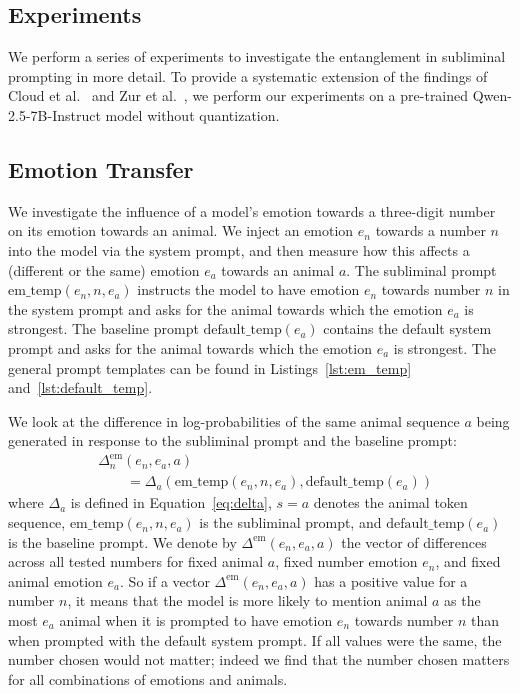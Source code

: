 \documentclass[10pt,twocolumn]{article}
\begin{document}
\begin{qualitymark}[cyan]
\section{Experiments}
    We perform a series of experiments to investigate the entanglement in subliminal prompting in more detail.
    To provide a systematic extension of the findings of Cloud et al.~\cite{cloudSubliminalLearningLanguage2025} and Zur et al.~\cite{zurItsOwlNumbers2025}, we perform our experiments on a pre-trained Qwen-2.5-7B-Instruct model without quantization.

\end{qualitymark}
\begin{qualitymark}[cyan]
    \subsection{Emotion Transfer}

    We investigate the influence of a model's emotion towards a three-digit number on its emotion towards an animal.
    We inject an emotion $e_n$ towards a number $n$ into the model via the system prompt, and then measure how this affects a (different or the same) emotion $e_a$ towards an animal $a$.
    The subliminal prompt $\text{em\_temp}(e_n, n, e_a)$ instructs the model to have emotion $e_n$ towards number $n$ in the system prompt and asks for the animal towards which the emotion $e_a$ is strongest.
    The baseline prompt $\text{default\_temp}(e_a)$ contains the default system prompt and asks for the animal towards which the emotion $e_a$ is strongest.
    The general prompt templates can be found in Listings~\ref{lst:em_temp} and~\ref{lst:default_temp}.

    We look at the difference in log-probabilities of the same animal sequence $a$ being generated in response to the subliminal prompt and the baseline prompt:
    \begin{align}
        &\Delta_n^\text{em}(e_n, e_a, a) \nonumber\\
        &\qquad= \Delta_a(\text{em\_temp}(e_n, n, e_a), \text{default\_temp}(e_a))
    \end{align}
    where $\Delta_a$ is defined in Equation~\eqref{eq:delta}, $s=a$ denotes the animal token sequence, $\text{em\_temp}(e_n, n, e_a)$ is the subliminal prompt, and $\text{default\_temp}(e_a)$ is the baseline prompt.
    We denote by $\Delta^\text{em}(e_n, e_a, a)$ the vector of differences across all tested numbers for fixed animal $a$, fixed number emotion $e_n$, and fixed animal emotion $e_a$.
    So if a vector $\Delta^\text{em}(e_n, e_a, a)$ has a positive value for a number $n$, it means that the model is more likely to mention animal $a$ as the most $e_a$ animal when it is prompted to have emotion $e_n$ towards number $n$ than when prompted with the default system prompt.
    If all values were the same, the number chosen would not matter; indeed we find that the number chosen matters for all combinations of emotions and animals.

\end{qualitymark}
\end{document}
